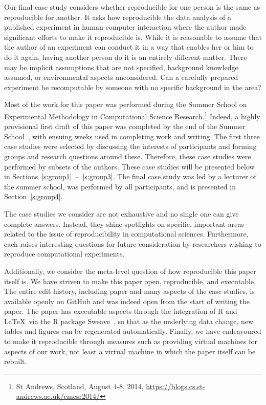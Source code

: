 Our final case study considers whether reproducible for one person is the same
as reproducible for another. It asks how reproducible the data analysis of a
published experiment in human-computer interaction where the author made
significant efforts to make it reproducible is. While it is reasonable to assume
that the author of an experiment can conduct it in a way that enables her or him
to do it again, having another person do it is an entirely different matter.
There may be implicit assumptions that are not specified, background knowledge
assumed, or environmental aspects unconsidered. Can a carefully prepared
experiment be recomputable by someone with no specific background in the area?

Most of the work for this paper was performed during the Summer School on
Experimental Methodology in Computational Science Research.\footnote{St
Andrews, Scotland, August 4-8, 2014,
\url{https://blogs.cs.st-andrews.ac.uk/emcsr2014/}}
Indeed, a highly
provisional first draft of this paper was completed by the end of the Summer
School~\cite{emcsr_arxiv_draft}, with ensuing weeks used in completing work and writing.  
The first three case studies
were selected by discussing the interests of participants and forming groups
and research questions around these. Therefore, these case studies were
performed by subsets of the authors. These case studies will be
presented below in Sections~\ref{s:group1}~--~\ref{s:group3}. The final case
study was led by a lecturer of the summer school, was performed by all
participants, and is presented in Section~\ref{s:group4}.

The case studies we consider are not exhaustive and no single one can give
complete answers. Instead, they shine spotlights on specific, important areas
related to the issue of reproducibility in computational sciences. Furthermore,
each raises interesting questions for future consideration by researchers
wishing to reproduce computational experiments.

Additionally, we consider the meta-level question of how reproducible this paper
itself is.  We have striven to make this paper open, reproducible, and
executable.
The entire edit history, including paper and many aspects of the
case studies, is available openly on
GitHub
and was indeed open from the start
of writing the paper.  
\cite{summerschoolpaper}
The paper has executable aspects through the integration of R
and \LaTeX\ via the R package Sweave~\cite{pineda-krch:sweave}, so that as the underlying
data change, new tables and figures can be regenerated automatically. Finally,
we have endeavoured to make it reproducible through measures such as providing
virtual machines for aspects of our work, not least a virtual machine in which
the paper itself can be rebuilt.
